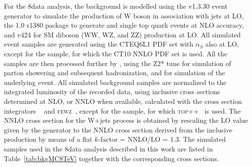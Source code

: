For the 8\TeV data analysis, the background is modelled using the  v1.3.30 event generator to simulate the production of W boson in association with jets at LO,
the \POWHEG{} 1.0 r1380 package to generate \ttbar and single top quark events at NLO accuracy, and  v424 for SM diboson (WW, WZ, and ZZ) production at LO.
All simulated event samples are generated using the CTEQ6L1 PDF set with $\alpha_S$ also at LO, except for the \POWHEG{} \ttbar sample,
for which the CT10 NNLO PDF set is used.
All the samples are then processed further by , using the Z2* tune for simulation of parton showering and subsequent hadronization,
and for simulation of the underlying event. All simulated background samples are normalized to the integrated luminosity of the recorded data, using inclusive cross sections determined at NLO,
or NNLO when available, calculated with the cross section integrators \MCFM{}~\cite{Campbell:2003hd,Campbell:2011bn,Campbell:2012uf,Campbell:2004ch}
and \textsc{fewz}~\cite{Li:2012wna}, except for the \ttbar sample, for which \textsc{top++}~\cite{Czakon:2011xx} is used.
The NNLO cross section for the W+jets process is obtained by rescaling the LO value given by the generator to the NNLO cross section
derived from the inclusive production by means of a flat $k$-factor = NNLO/LO = 1.3.
The simulated samples used in the 8\TeV data analysis described in this work are listed in Table~\ref{tab:bkgMC8TeV} together with the corresponding cross sections.\\

